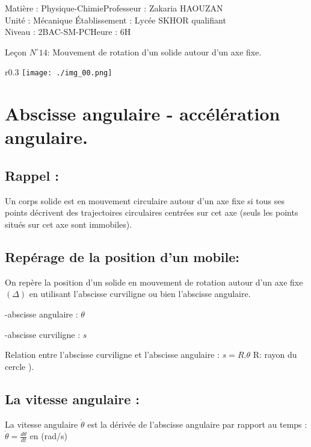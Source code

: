 \documentclass[12pt]{article}
\author{Zakaria HAOUZAN}
\date{\today}
\newcommand\headerMe[2]{\noindent{}#1\hfill#2}
\begin{document}
\headerMe{Matière : Physique-Chimie}{Professeur : Zakaria HAOUZAN}\\
\headerMe{Unité : Mécanique }{Établissement : Lycée SKHOR qualifiant}\\
\headerMe{Niveau : 2BAC-SM-PC}{Heure : 6H}\\

\begin{center}

    \Large{Leçon $N^{\circ} 14 $: \color{red}Mouvement de rotation d’un solide autour d’un axe fixe.}
\end{center}

\begin{wrapfigure}[5]{r}{0.3\textwidth}
	\vspace{-1cm}
	\texttt{[image: ./img\_00.png]}
\end{wrapfigure}

\section{Abscisse angulaire - accélération angulaire. }
\subsection{Rappel : }
Un corps solide est en mouvement circulaire autour d'un axe fixe si tous ses points décrivent des trajectoires circulaires
centrées sur cet axe (seuls les points situés sur cet axe sont immobiles).

\subsection{Repérage de la position d'un mobile: }

On repère la position d'un solide en mouvement de rotation autour d'un axe fixe $(\Delta)$ en utilisant l'abscisse curviligne ou bien l'abscisse angulaire.

-abscisse angulaire : $\theta$

-abscisse curviligne : $s$

Relation entre l'abscisse curviligne et l'abscisse angulaire : $s = R.\theta$  R: rayon du cercle ).

\subsection{La vitesse angulaire : }
La vitesse angulaire $\dot\theta$ est la dérivée de l'abscisse angulaire par rapport au temps : $\dot{\theta} = \frac{d\theta}{dt}$ en (rad/s)
\end{document}
